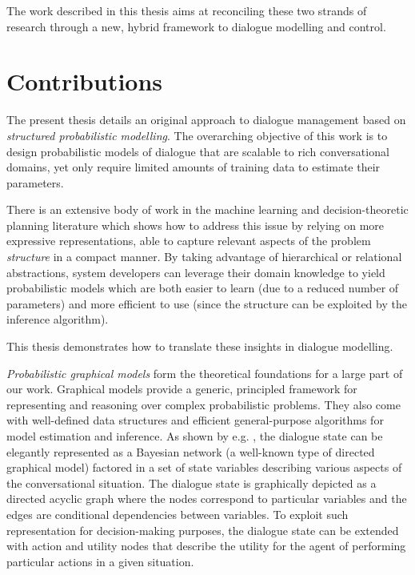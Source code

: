 The work described in this thesis aims at reconciling these two strands of research through a new, hybrid framework to dialogue modelling and control. 

\section{Contributions}

The present thesis details an original approach to dialogue management based on \textit{structured probabilistic modelling}.  The overarching objective of this work is to design probabilistic models of dialogue that are scalable to rich conversational domains, yet only require limited amounts of training data to estimate their parameters.

There is an extensive body of work in the machine learning and decision-theoretic planning literature which shows how to address this issue by relying on more expressive representations, able to capture relevant aspects of the problem \textit{structure} in a compact manner. By taking advantage of hierarchical or relational abstractions, system developers can leverage their domain knowledge to yield probabilistic models which are both easier to learn (due to a reduced number of parameters) and more efficient to use (since the structure can be exploited by the inference algorithm).

This thesis demonstrates how to translate these insights in dialogue modelling. 

\textit{Probabilistic graphical models} \citep{Koller+Friedman:09} form the theoretical foundations for a large part of our work.  Graphical models provide a generic, principled framework for representing and reasoning over complex probabilistic problems. They also come with well-defined data structures and efficient general-purpose algorithms for model estimation and inference.  As shown  by e.g. \cite{Thomson:2010:BUD:1772996.1773040}, the dialogue state can be elegantly represented as a Bayesian network (a well-known type of directed graphical model) factored in a set of state variables describing various aspects of the conversational situation.  The dialogue state is graphically depicted as a directed acyclic graph where the nodes correspond to particular variables and the edges are conditional dependencies between variables. To exploit such representation for decision-making purposes, the dialogue state can be extended with action and utility nodes that describe the utility for the agent of performing particular actions in a given situation. 

